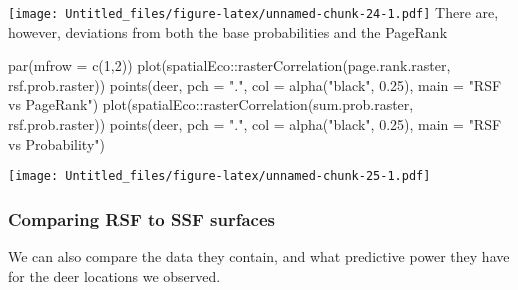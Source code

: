 \documentclass[
]{article}
\newenvironment{Shaded}{\begin{snugshade}}{\end{snugshade}}
\newcommand{\AttributeTok}[1]{\textcolor[rgb]{0.77,0.63,0.00}{#1}}
\newcommand{\DecValTok}[1]{\textcolor[rgb]{0.00,0.00,0.81}{#1}}
\newcommand{\FloatTok}[1]{\textcolor[rgb]{0.00,0.00,0.81}{#1}}
\newcommand{\FunctionTok}[1]{\textcolor[rgb]{0.00,0.00,0.00}{#1}}
\newcommand{\NormalTok}[1]{#1}
\newcommand{\SpecialCharTok}[1]{\textcolor[rgb]{0.00,0.00,0.00}{#1}}
\newcommand{\StringTok}[1]{\textcolor[rgb]{0.31,0.60,0.02}{#1}}
\begin{document}
\texttt{[image: Untitled\_files/figure-latex/unnamed-chunk-24-1.pdf]}
There are, however, deviations from both the base probabilities and the
PageRank

\begin{Shaded}
\begin{Highlighting}[]
\FunctionTok{par}\NormalTok{(}\AttributeTok{mfrow =} \FunctionTok{c}\NormalTok{(}\DecValTok{1}\NormalTok{,}\DecValTok{2}\NormalTok{))}
\FunctionTok{plot}\NormalTok{(spatialEco}\SpecialCharTok{::}\FunctionTok{rasterCorrelation}\NormalTok{(page.rank.raster, rsf.prob.raster))}
\FunctionTok{points}\NormalTok{(deer, }\AttributeTok{pch =} \StringTok{"."}\NormalTok{, }\AttributeTok{col =} \FunctionTok{alpha}\NormalTok{(}\StringTok{"black"}\NormalTok{, }\FloatTok{0.25}\NormalTok{), }\AttributeTok{main =} \StringTok{"RSF vs PageRank"}\NormalTok{)}
\FunctionTok{plot}\NormalTok{(spatialEco}\SpecialCharTok{::}\FunctionTok{rasterCorrelation}\NormalTok{(sum.prob.raster, rsf.prob.raster))}
\FunctionTok{points}\NormalTok{(deer, }\AttributeTok{pch =} \StringTok{"."}\NormalTok{, }\AttributeTok{col =} \FunctionTok{alpha}\NormalTok{(}\StringTok{"black"}\NormalTok{, }\FloatTok{0.25}\NormalTok{), }\AttributeTok{main =} \StringTok{"RSF vs Probability"}\NormalTok{)}
\end{Highlighting}
\end{Shaded}

\texttt{[image: Untitled\_files/figure-latex/unnamed-chunk-25-1.pdf]}

\hypertarget{comparing-rsf-to-ssf-surfaces}{%
\subsubsection{Comparing RSF to SSF
surfaces}\label{comparing-rsf-to-ssf-surfaces}}

We can also compare the data they contain, and what predictive power
they have for the deer locations we observed.
\end{document}
